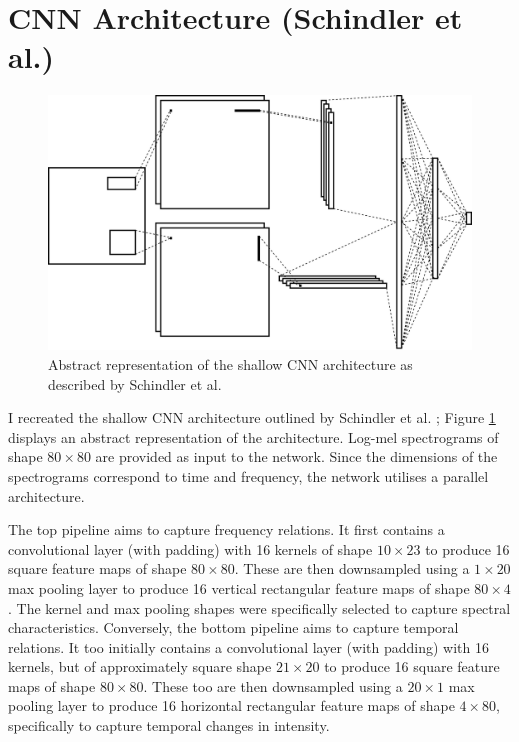 \documentclass[conference]{IEEEtran}
\begin{document}
\section{CNN Architecture (Schindler et al.)}

\begin{figure}[htbp]
    \centerline{\includegraphics[width=\columnwidth]{architecture.jpg}}
    \caption{Abstract representation of the shallow CNN architecture as described by Schindler et al.}
    \label{architecture}
\end{figure}

I recreated the shallow CNN architecture outlined by Schindler et al. \cite{SchindlerLidyRauber}; Figure \ref{architecture} displays an abstract representation of the architecture.
Log-mel spectrograms of shape $80\times80$ are provided as input to the network.
Since the dimensions of the spectrograms correspond to time and frequency, the network utilises a parallel architecture.

The top pipeline aims to capture frequency relations.
It first contains a convolutional layer (with padding) with 16 kernels of shape $10\times23$ to produce 16 square feature maps of shape $80\times80$.
These are then downsampled using a $1\times20$ max pooling layer to produce 16 vertical rectangular feature maps of shape $80\times4$.
The kernel and max pooling shapes were specifically selected to capture spectral characteristics.
Conversely, the bottom pipeline aims to capture temporal relations.
It too initially contains a convolutional layer (with padding) with 16 kernels, but of approximately square shape $21\times20$ to produce 16 square feature maps of shape $80\times80$.
These too are then downsampled using a $20\times1$ max pooling layer to produce 16 horizontal rectangular feature maps of shape $4\times80$, specifically to capture temporal changes in intensity.
\end{document}
